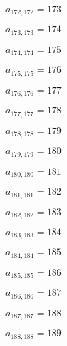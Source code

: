 \documentclass[a4paper,12pt]{article}
\begin{document}
$a _{ 172, 172 } = 173$

$a _{ 173, 173 } = 174$

$a _{ 174, 174 } = 175$

$a _{ 175, 175 } = 176$

$a _{ 176, 176 } = 177$

$a _{ 177, 177 } = 178$

$a _{ 178, 178 } = 179$

$a _{ 179, 179 } = 180$

$a _{ 180, 180 } = 181$

$a _{ 181, 181 } = 182$

$a _{ 182, 182 } = 183$

$a _{ 183, 183 } = 184$

$a _{ 184, 184 } = 185$

$a _{ 185, 185 } = 186$

$a _{ 186, 186 } = 187$

$a _{ 187, 187 } = 188$

$a _{ 188, 188 } = 189$
\end{document}
